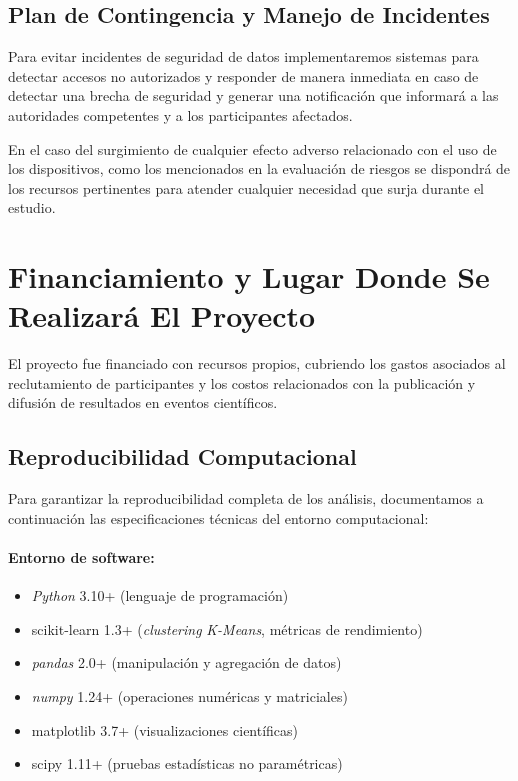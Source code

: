 \subsection{Plan de Contingencia y Manejo de Incidentes}
\label{subsec:plan_contingencia}

Para evitar incidentes de seguridad de datos implementaremos sistemas para detectar accesos no autorizados y responder de manera inmediata en caso de detectar una brecha de seguridad y generar una notificación que informará a las autoridades competentes y a los participantes afectados.

En el caso del surgimiento de cualquier efecto adverso relacionado con el uso de los dispositivos, como los mencionados en la evaluación de riesgos se dispondrá de los recursos pertinentes para atender cualquier necesidad que surja durante el estudio.

\section{Financiamiento y Lugar Donde Se Realizará El Proyecto}
\label{sec:financiamiento_lugar}

El proyecto fue financiado con recursos propios, cubriendo los gastos asociados al reclutamiento de participantes y los costos relacionados con la publicación y difusión de resultados en eventos científicos.

\subsection{Reproducibilidad Computacional}
\label{subsec:reproducibilidad_computacional}

Para garantizar la reproducibilidad completa de los análisis, documentamos a continuación las especificaciones técnicas del entorno computacional:

\paragraph{Entorno de software:}
\begin{itemize}
    \item \textit{Python} 3.10+ (lenguaje de programación)
    \item scikit-learn 1.3+ (\textit{clustering} \textit{K-Means}, métricas de rendimiento)
    \item \textit{pandas} 2.0+ (manipulación y agregación de datos)
    \item \textit{numpy} 1.24+ (operaciones numéricas y matriciales)
    \item matplotlib 3.7+ (visualizaciones científicas)
    \item scipy 1.11+ (pruebas estadísticas no paramétricas)
\end{itemize}

